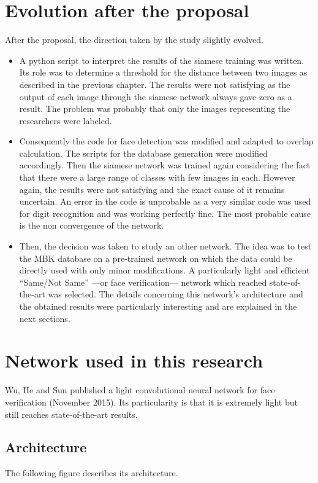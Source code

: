 \section{Evolution after the proposal}
After the proposal, the direction taken by the study slightly evolved.
\begin{itemize}
\item A python script to interpret the results of the siamese training was written. Its role was to determine a threshold for the distance between two images as described in the previous chapter. The results were not satisfying as the output of each image through the siamese network always gave zero as a result. The problem was probably that only the images representing the researchers were labeled.
\item Consequently the code for face detection was modified and adapted to overlap calculation. The scripts for the database generation were modified accordingly. Then the siamese network was trained again considering the fact that there were a large range of classes with few images in each. However again, the results were not satisfying and the exact cause of it remains uncertain. An error in the code is unprobable as a very similar code was used for digit recognition and was working perfectly fine. The most probable cause is the non convergence of the network.
\item Then, the decision was taken to study an other network. The idea was to test the MBK database on a pre-trained network on which the data could be directly used with only minor modifications. A particularly light and efficient \enquote{Same/Not Same} ---or face verification--- network which reached state-of-the-art was selected. The details concerning this network's architecture and the obtained results were particularly interesting and are explained in the next sections.
\end{itemize}

\section{Network used in this research}

Wu, He and Sun published a light convolutional neural network for face verification (November 2015). Its particularity is that it is extremely light but still reaches state-of-the-art results.

\subsection{Architecture}
The following figure describes its architecture.

